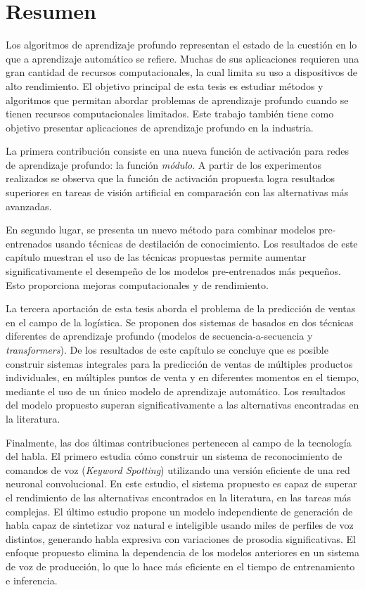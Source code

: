 
\chapter*{Resumen}


Los algoritmos de aprendizaje profundo representan el estado de la cuestión en lo que a aprendizaje automático se refiere. Muchas de sus aplicaciones requieren una gran cantidad de recursos computacionales, la cual limita su uso a dispositivos de alto rendimiento. El objetivo principal de esta tesis es estudiar métodos y algoritmos que permitan abordar problemas de aprendizaje profundo cuando se tienen recursos computacionales limitados. Este trabajo también tiene como objetivo presentar aplicaciones de aprendizaje profundo en la industria.

La primera contribución consiste en una nueva función de activación para redes de aprendizaje profundo: la función \textit{módulo}. A partir de los experimentos realizados se observa que la función de activación propuesta logra resultados superiores en tareas de visión artificial en comparación con las alternativas más avanzadas.

En segundo lugar, se presenta un nuevo método para combinar modelos pre-entrenados usando técnicas de destilación de conocimiento. Los resultados de este capítulo muestran el uso de las técnicas propuestas permite aumentar significativamente el desempeño de los modelos pre-entrenados más pequeños. Esto proporciona mejoras computacionales y de rendimiento.

La tercera aportación de esta tesis aborda el problema de la predicción de ventas en el campo de la logística. Se proponen dos sistemas de basados en dos técnicas diferentes de aprendizaje profundo (modelos de secuencia-a-secuencia y \textit{transformers}). De los resultados de este capítulo se concluye que es posible construir sistemas integrales para la predicción de ventas de múltiples productos individuales, en múltiples puntos de venta y en diferentes momentos en el tiempo, mediante el uso de un único modelo de aprendizaje automático. Los resultados del modelo propuesto superan significativamente a las alternativas encontradas en la literatura.

Finalmente, las dos últimas contribuciones pertenecen al campo de la tecnología del habla. El primero estudia cómo construir un sistema de reconocimiento de comandos de voz (\textit{Keyword Spotting}) utilizando una versión eficiente de una red neuronal convolucional. En este estudio, el sistema propuesto es capaz de superar el rendimiento de las alternativas encontrados en la literatura, en las tareas más complejas. El último estudio propone un modelo independiente de generación de habla capaz de sintetizar voz natural e inteligible usando miles de perfiles de voz distintos, generando habla expresiva con variaciones de prosodia significativas. El enfoque propuesto elimina la dependencia de los modelos anteriores en un sistema de voz de producción, lo que lo hace más eficiente en el tiempo de entrenamiento e inferencia.

